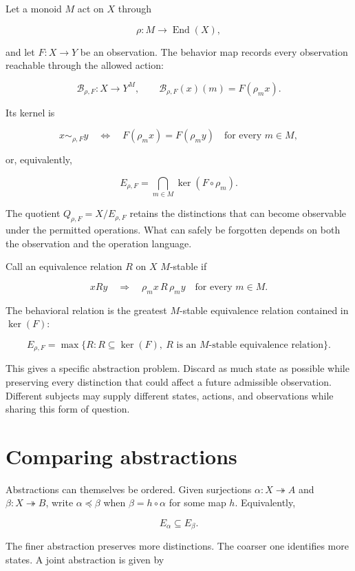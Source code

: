 \documentclass[11pt,oneside,openany]{book}
\begin{document}
Let a monoid \(M\) act on \(X\) through

\[
\rho:M\longrightarrow\operatorname{End}(X),
\]

and let \(F:X\longrightarrow Y\) be an observation. The behavior map records every observation reachable through the allowed action:

\[
\mathcal B_{\rho,F}:X\longrightarrow Y^M,
\qquad
\mathcal B_{\rho,F}(x)(m)=F(\rho_m x).
\]

Its kernel is

\[
x\sim_{\rho,F}y
\quad\Longleftrightarrow\quad
F(\rho_m x)=F(\rho_m y)\quad\text{for every }m\in M,
\]

or, equivalently,

\[
E_{\rho,F}=\bigcap_{m\in M}\ker(F\circ\rho_m).
\]

The quotient \(Q_{\rho,F}=X/E_{\rho,F}\) retains the distinctions that can become observable under the permitted operations. What can safely be forgotten depends on both the observation and the operation language.

Call an equivalence relation \(R\) on \(X\) \(M\)-stable if

\[
xRy\quad\Longrightarrow\quad\rho_m x\,R\,\rho_m y
\quad\text{for every }m\in M.
\]

The behavioral relation is the greatest \(M\)-stable equivalence relation contained in \(\ker(F)\):

\[
E_{\rho,F}
=\max\{R:R\subseteq\ker(F),\ R\text{ is an }M\text{-stable equivalence relation}\}.
\]

This gives a specific abstraction problem. Discard as much state as possible while preserving every distinction that could affect a future admissible observation. Different subjects may supply different states, actions, and observations while sharing this form of question.

\section{Comparing abstractions}
Abstractions can themselves be ordered. Given surjections \(\alpha:X\twoheadrightarrow A\) and \(\beta:X\twoheadrightarrow B\), write \(\alpha\preceq\beta\) when \(\beta=h\circ\alpha\) for some map \(h\). Equivalently,

\[
E_\alpha\subseteq E_\beta.
\]

The finer abstraction preserves more distinctions. The coarser one identifies more states. A joint abstraction is given by
\end{document}
